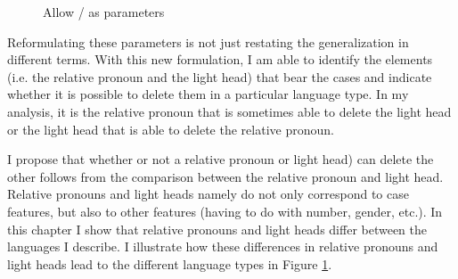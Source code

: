 \begin{figure}[H]
  \centering
    \footnotesize{
    }
    \caption{Allow / as parameters}
    \label{fig:two-parameters-different}
\end{figure}

Reformulating these parameters is not just restating the generalization in different terms. With this new formulation, I am able to identify the elements (i.e. the relative pronoun and the light head) that bear the cases and indicate whether it is possible to delete them in a particular language type. In my analysis, it is the relative pronoun that is sometimes able to delete the light head or the light head that is able to delete the relative pronoun.

I propose that whether or not a relative pronoun or light head) can delete the other follows from the comparison between the relative pronoun and light head. Relative pronouns and light heads namely do not only correspond to case features, but also to other features (having to do with number, gender, etc.). In this chapter I show that relative pronouns and light heads differ between the languages I describe. I illustrate how these differences in relative pronouns and light heads lead to the different language types in Figure \ref{fig:two-parameters-different}.


